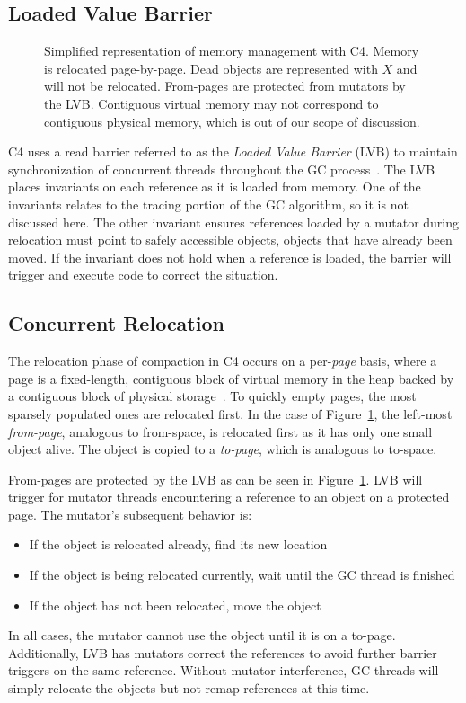 \documentclass{sig-alternate}
\begin{document}
\subsection{Loaded Value Barrier}
\label{sec:c4LVB}

\begin{figure}
\centering
{}
\caption{Simplified representation of memory management with C4. Memory is relocated
page-by-page. Dead objects are represented with $X$ and will not be relocated.
From-pages are protected from mutators by the LVB. Contiguous virtual memory
may not correspond to contiguous physical memory, which is out of our scope of discussion.}
\label{fig:c4Memory}
\end{figure}

C4 uses a read barrier referred to as the \emph{Loaded Value Barrier} (LVB) to 
maintain synchronization of concurrent threads throughout the GC process~\cite{Tene:C4}. The LVB 
places invariants on each reference as it is loaded from memory.
One of the invariants relates to the tracing portion of the GC algorithm, so
it is not discussed here. The other invariant ensures
references loaded by a mutator during relocation must point to safely
accessible objects, objects that have already been moved.
If the invariant does not hold
when a reference is loaded, the barrier will trigger and execute code to correct
the situation.


\subsection{Concurrent Relocation}
\label{sec:c4Relocation}

The relocation phase of compaction in C4 occurs on a per-\emph{page}
basis, where a page is a fixed-length, contiguous block of virtual memory in the heap
backed by a contiguous block of physical storage~\cite{Tene:C4}.
To quickly empty pages, the most sparsely populated ones are relocated
first. In the case of Figure~\ref{fig:c4Memory}, the left-most 
\emph{from-page}, analogous to from-space, is relocated first as it has only one small object alive.
The object is copied to a \emph{to-page}, which is analogous to to-space.

From-pages are protected by the LVB as can be seen in Figure~\ref{fig:c4Memory}. 
LVB will trigger for mutator threads encountering a reference to an object
on a protected page. The mutator's subsequent behavior is:
\begin{itemize}
\item If the object is relocated already, find its new location
\item If the object is being relocated currently, wait until the GC thread is finished
\item If the object has not been relocated, move the object 
\end{itemize}
In all cases, the mutator cannot use the object until it is on a to-page.
Additionally, LVB has mutators correct the
references to avoid further barrier triggers on the same
reference.
Without mutator interference, GC threads will simply relocate the objects but
not remap references at this time. 
\end{document}
